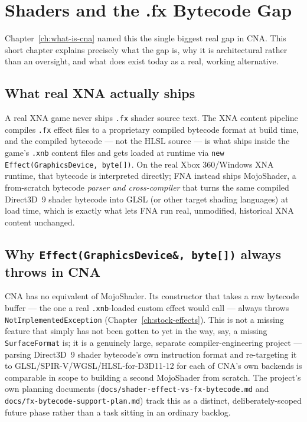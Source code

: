 \chapter{Shaders and the .fx Bytecode Gap}
\label{ch:shader-fx-gap}

Chapter~\ref{ch:what-is-cna} named this the single biggest real gap in CNA. This short
chapter explains precisely what the gap is, why it is architectural rather than an
oversight, and what does exist today as a real, working alternative.

\section{What real XNA actually ships}

A real XNA game never ships \texttt{.fx} shader source text. The XNA content pipeline
compiles \texttt{.fx} effect files to a proprietary compiled bytecode format at build time,
and the compiled bytecode --- not the HLSL source --- is what ships inside the game's
\texttt{.xnb} content files and gets loaded at runtime via
\texttt{new Effect(GraphicsDevice, byte[])}. On the real Xbox 360/Windows XNA runtime, that
bytecode is interpreted directly; FNA instead ships MojoShader, a from-scratch bytecode
\emph{parser and cross-compiler} that turns the same compiled Direct3D~9 shader bytecode into
GLSL (or other target shading languages) at load time, which is exactly what lets FNA run
real, unmodified, historical XNA content unchanged.

\section{Why \texttt{Effect(GraphicsDevice\&, byte[])} always throws in CNA}

CNA has no equivalent of MojoShader. Its  constructor that takes a raw
bytecode buffer --- the one a real \texttt{.xnb}-loaded custom effect would call --- always
throws \texttt{NotImplementedException} (Chapter~\ref{ch:stock-effects}). This is not a
missing feature that simply has not been gotten to yet in the way, say, a missing
\texttt{SurfaceFormat} is; it is a genuinely large, separate compiler-engineering project ---
parsing Direct3D~9 shader bytecode's own instruction format and re-targeting it to
GLSL/SPIR-V/WGSL/HLSL-for-D3D11-12 for each of CNA's own backends is comparable in scope to
building a second MojoShader from scratch. The project's own planning documents
(\texttt{docs/shader-effect-vs-fx-bytecode.md} and \texttt{docs/fx-bytecode-support-plan.md})
track this as a distinct, deliberately-scoped future phase rather than a task sitting in an
ordinary backlog.

